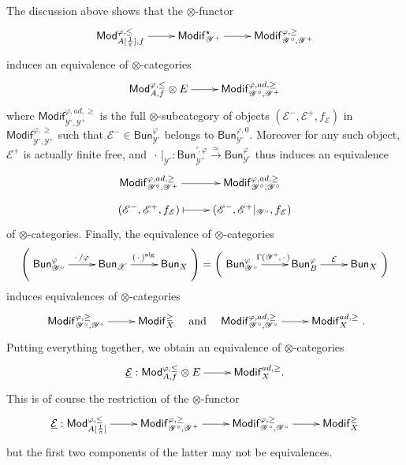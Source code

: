 \documentclass[11pt]{article}
\theoremstyle{definition}
\numberwithin{equation}{section}
\numberwithin{figure}{section}
\numberwithin{table}{section}
\newcommand{\Mod}{\mathsf{Mod}}
\newcommand{\Modif}{\mathsf{Modif}}
\newcommand{\Bun}{\mathsf{Bun}}
\begin{document}
\subsubsection{}\label{subsec:ConstruFarguesFunctEff}

The discussion above shows that the $\otimes$-functor
\[
\xymatrix@C=2pc{\Mod_{A[\frac{1}{\pi}],f}^{\varphi,\leq}\ar[r] & \Modif_{\mathscr{Y}^{+}}^{\star}\ar[r] & \Modif_{\mathscr{Y}^{\circ},\mathscr{Y}^{+}}^{\varphi,\geq}}
\]
induces an equivalence of $\otimes$-categories
\[
\xymatrix{\Mod_{A,f}^{\varphi,\leq}\otimes E\ar[r] & \Modif_{\mathscr{Y}^{\circ},\mathscr{Y}^{+}}^{\varphi,ad,\geq}}
\]
where $\Modif_{\mathscr{Y}^{\circ},\mathscr{Y}^{+}}^{\varphi,ad,\geq}$ is the full $\otimes$-subcategory of objects $(\mathscr{E}^{-},\mathscr{E}^{+},f_{\mathscr{E}})$ in $\Modif_{\mathscr{Y}^{\circ},\mathscr{Y}^{+}}^{\varphi,\geq}$ such that $\mathscr{E}^{-}\in\Bun_{\mathscr{Y}^{\circ}}^{\varphi}$ belongs to $\Bun_{\mathscr{Y}^{\circ}}^{\varphi,0}$. Moreover for any such object, $\mathscr{E}^{+}$ is actually finite free, and ${\,\cdot\,}\vert_{\mathscr{Y}^{\circ}}:\Bun_{\mathscr{Y}^{+}}^{\prime,\varphi}\stackrel{\simeq}{\rightarrow}\Bun_{\mathscr{Y}^{\circ}}^{\varphi}$ thus induces an equivalence
\[
\xymatrix@R=0.5pc{\Modif_{\mathscr{Y}^{\circ},\mathscr{Y}^{+}}^{\varphi,ad,\geq}\ar[r] & \Modif_{\mathscr{Y}^{\circ},\mathscr{Y}^{\circ}}^{\varphi,ad,\geq}\\
(\mathscr{E}^{-},\mathscr{E}^{+},f_{\mathscr{E}})\ar@{|->}[r] & (\mathscr{E}^{-},\mathscr{E}^{+}\vert_{\mathscr{Y}^{\circ}},f_{\mathscr{E}}) }
\]
of $\otimes$-categories. Finally, the equivalence of $\otimes$-categories
\[
\left(\xymatrix{\Bun_{\mathscr{Y}^{\circ}}^{\varphi}\ar[r]^{{\,\cdot\,}/\varphi} & \Bun_{\mathscr{X}}\ar[r]^{({\,\cdot\,})^{\mathrm{alg}}} & \Bun_{X}}
\right)=\left(\xymatrix{\Bun_{\mathscr{Y}^{\circ}}^{\varphi}\ar[r]^{\Gamma(\mathscr{Y}^{\circ},{\,\cdot\,})} & \Bun_{B}^{\varphi}\ar[r]^{\mathcal{E}} & \Bun_{X}}
\right)
\]
induces equivalences of $\otimes$-categories
\[
\xymatrix{\Modif_{\mathscr{Y}^{\circ},\mathscr{Y}^{\circ}}^{\varphi,\geq}\ar[r] & \Modif_{X}^{\geq}}
\quad\text{and}\quad\xymatrix{\Modif_{\mathscr{Y}^{\circ},\mathscr{Y}^{\circ}}^{\varphi,ad,\geq}\ar[r] & \Modif_{X}^{ad,\geq}}.
\]
Putting everything together, we obtain an equivalence of $\otimes$-categories
\[
\xymatrix{\underline{\mathcal{E}}:\Mod_{A,f}^{\varphi,\leq}\otimes E\ar[r] & \Modif_{X}^{ad,\geq}.}
\]
This is of course the restriction of the $\otimes$-functor
\[
\xymatrix{\underline{\mathcal{E}}:\Mod_{A[\frac{1}{\pi}]}^{\varphi,\leq}\ar[r] & \Modif_{\mathscr{Y}^{\circ},\mathscr{Y}^{+}}^{\varphi,\geq}\ar[r] & \Modif_{\mathscr{Y}^{\circ},\mathscr{Y}^{\circ}}^{\varphi,\geq}\ar[r] & \Modif_{X}^{\geq}}
\]
but the first two components of the latter may not be equivalences.
\end{document}
